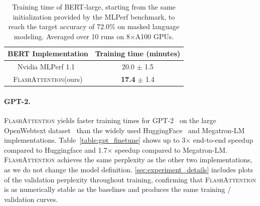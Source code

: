 \documentclass{article}
\newcommand{\sysname}{\textsc{FlashAttention}\xspace}
\begin{document}
\begin{table}[h]
  \captionsetup{font=small}
  \small
  \centering
  \vspace{-1em}
  \caption{\label{table:bert_speed}Training time of BERT-large,
    starting
    from the same initialization provided by the MLPerf benchmark,
    to reach the
    target accuracy of 72.0\% on masked language modeling.
    Averaged over 10 runs on 8$\times$A100 GPUs.
}
  \iftoggle{arxiv}{}{
    \resizebox{0.5\linewidth}{!}
  }
  {
    \begin{tabular}{@{}c|c@{}}
      BERT Implementation & Training time (minutes)  \\ \hline
      Nvidia MLPerf 1.1~\citep{mattson2020mlperf} & 20.0 $\pm$ 1.5 \\
      \sysname (ours) & \textbf{17.4} $\pm$ 1.4 \\
    \end{tabular}
  }
  \vspace{-1em}
\end{table}

\paragraph{GPT-2.}
\sysname yields faster training times for GPT-2~\citep{radford2019language} on the large OpenWebtext dataset~\citep{Gokaslan2019OpenWeb} than the widely used HuggingFace~\citep{wolf-etal-2020-transformers} and Megatron-LM~\citep{shoeybi2019megatron} implementations.
Table~\ref{table:gpt_finetune} shows up to 3$\times$ end-to-end speedup compared to Huggingface
and 1.7$\times$ speedup compared to Megatron-LM.
\sysname achieves the same perplexity as the other two
implementations, as we do not change the model definition.
\cref{sec:experiment_details} includes plots of the validation perplexity throughout training,
confirming that \sysname is as numerically stable as the baselines
and produces the same training / validation curves.
\end{document}
